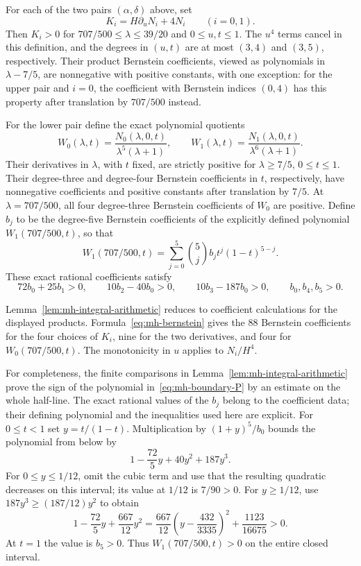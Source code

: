 \begin{lemma}\label{lem:mh-integral-arithmetic}
For each of the two pairs $(\alpha,\delta)$ above, set
\[
 K_i=H\partial_uN_i+4N_i\qquad(i=0,1).
\]
Then $K_i>0$ for $707/500\le\lambda\le39/20$ and $0\le u,t\le1$. The $u^4$ terms cancel in this definition, and the degrees in $(u,t)$ are at most $(3,4)$ and $(3,5)$, respectively. Their product Bernstein coefficients, viewed as polynomials in $\lambda-7/5$, are nonnegative with positive constants, with one exception: for the upper pair and $i=0$, the coefficient with Bernstein indices $(0,4)$ has this property after translation by $707/500$ instead.

For the lower pair define the exact polynomial quotients
\[
 W_0(\lambda,t)=\frac{N_0(\lambda,0,t)}{\lambda^5(\lambda+1)},\qquad
 W_1(\lambda,t)=\frac{N_1(\lambda,0,t)}{\lambda^6(\lambda+1)}.
\]
Their derivatives in $\lambda$, with $t$ fixed, are strictly positive for $\lambda\ge7/5$, $0\le t\le1$. Their degree-three and degree-four Bernstein coefficients in $t$, respectively, have nonnegative coefficients and positive constants after translation by $7/5$. At $\lambda=707/500$, all four degree-three Bernstein coefficients of $W_0$ are positive. Define $b_j$ to be the degree-five Bernstein coefficients of the explicitly defined polynomial $W_1(707/500,t)$, so that
\begin{equation}\label{eq:mh-boundary-P}
 W_1(707/500,t)=\sum_{j=0}^5\binom5j b_jt^j(1-t)^{5-j}.
\end{equation}
These exact rational coefficients satisfy
\[
 72b_0+25b_1>0,\qquad10b_2-40b_0>0,\qquad10b_3-187b_0>0,
 \qquad b_0,b_4,b_5>0.
\]
\end{lemma}

Lemma~\ref{lem:mh-integral-arithmetic} reduces to coefficient calculations for the displayed products. Formula~\eqref{eq:mh-bernstein} gives the $88$ Bernstein coefficients for the four choices of $K_i$, nine for the two derivatives, and four for $W_0(707/500,t)$. The monotonicity in $u$ applies to $N_i/H^4$.

For completeness, the finite comparisons in Lemma~\ref{lem:mh-integral-arithmetic} prove the sign of the polynomial in~\eqref{eq:mh-boundary-P} by an estimate on the whole half-line. The exact rational values of the $b_j$ belong to the coefficient data; their defining polynomial and the inequalities used here are explicit.
For $0\le t<1$ set $y=t/(1-t)$. Multiplication by $(1+y)^5/b_0$ bounds the polynomial from below by
\[
 1-\frac{72}{5}y+40y^2+187y^3.
\]
For $0\le y\le1/12$, omit the cubic term and use that the resulting quadratic decreases on this interval; its value at $1/12$ is $7/90>0$. For $y\ge1/12$, use $187y^3\ge(187/12)y^2$ to obtain
\[
 1-\frac{72}{5}y+\frac{667}{12}y^2
 =\frac{667}{12}\left(y-\frac{432}{3335}\right)^2
     +\frac{1123}{16675}>0.
\]
At $t=1$ the value is $b_5>0$. Thus $W_1(707/500,t)>0$ on the entire closed interval.

